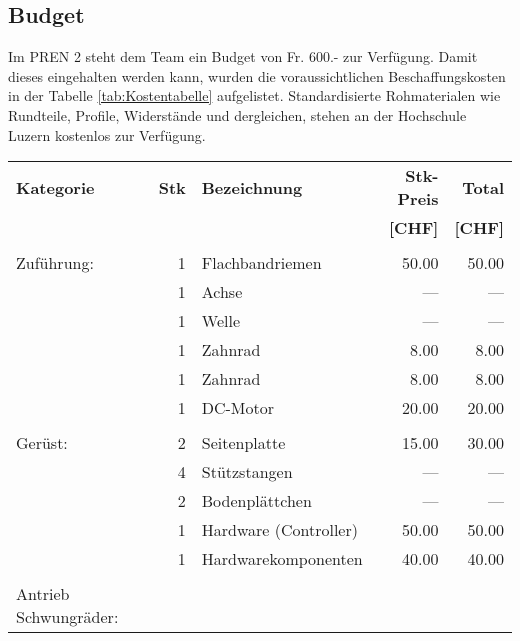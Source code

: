 \subsection{Budget}
    Im PREN 2 steht dem Team ein Budget von Fr. 600.- zur Verfügung. Damit 
    dieses eingehalten werden kann, wurden die voraussichtlichen 
    Beschaffungskosten in der Tabelle \ref{tab:Kostentabelle} aufgelistet. 
    Standardisierte Rohmaterialen wie Rundteile, Profile, Widerstände und 
    dergleichen, stehen an der Hochschule Luzern kostenlos zur Verfügung.
    \begin{longtable}{p{1.7cm}rlrr}
    \textbf{Kategorie} & \textbf{Stk} & \textbf{Bezeichnung} & \textbf{Stk-Preis}
    & \textbf{Total} \\ & & & \textbf{[CHF]} & \textbf{[CHF]} \\       
    \hline     &       &                              &        &        \\\endhead
    Zuführung: & 1     & Flachbandriemen              &  50.00 &  50.00 \\
               & 1     & Achse                        &  {---} &  {---} \\
               & 1     & Welle                        &  {---} &  {---} \\
               & 1     & Zahnrad                      &   8.00 &   8.00 \\
               & 1     & Zahnrad                      &   8.00 &   8.00 \\
               & 1     & DC-Motor                     &  20.00 &  20.00 \\
               &       &                              &        &        \\
       Gerüst: & 2     & Seitenplatte                 &  15.00 &  30.00 \\
               & 4     & Stützstangen                 &  {---} &  {---} \\
               & 2     & Bodenplättchen               &  {---} &  {---} \\
               & 1     & Hardware (Controller)        &  50.00 &  50.00 \\
               & 1     & Hardwarekomponenten          &  40.00 &  40.00 \\
               &       &                              &        &        \\
   \multirow{2}{1.7cm}{Antrieb Schwungräder:}  

\end{longtable}
